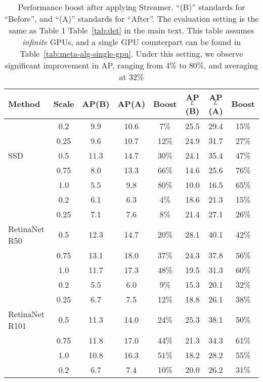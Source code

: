 \begin{table*}[]
\small
\centering
\caption{Performance boost after applying Streamer. ``(B)'' standards for ``Before'', and ``(A)'' standards for ``After''. The evaluation setting is the same as
\ifstandalonesupplement
    Table 1 
\else
    Table~\ref{tab:det}
\fi
in the main text. This table assumes {\em infinite} GPUs, and a single GPU counterpart can be found in Table~\ref{tab:meta-alg-single-gpu}. Under this setting, we observe significant improvement in AP, ranging from 4\% to 80\%, and averaging at 32\%
}
\label{tab:meta-alg-inf-gpu} 
\addtolength{\tabcolsep}{0.2em}
\vspace{-0.5em}
\begin{tabular}{lccccccc}
\toprule
Method & Scale & AP(B) & AP(A) & Boost & AP$_L$(B) & AP$_L$(A) & Boost \\
\midrule
                   & 0.2  & 9.9  & 10.6 & 7\%  & 25.5 & 29.4 & 15\% \\
                   & 0.25 & 9.6  & 10.7 & 12\% & 24.9 & 31.7 & 27\% \\
SSD                & 0.5  & 11.3 & 14.7 & 30\% & 24.1 & 35.4 & 47\% \\
                   & 0.75 & 8.0  & 13.3 & 66\% & 14.6 & 25.6 & 76\% \\
                   & 1.0  & 5.5  & 9.8  & 80\% & 10.0 & 16.5 & 65\% \\
\midrule
                   & 0.2  & 6.1  & 6.3  & 4\%  & 18.6 & 21.3 & 15\% \\
                   & 0.25 & 7.1  & 7.6  & 8\%  & 21.4 & 27.1 & 26\% \\
RetinaNet R50      & 0.5  & 12.3 & 14.7 & 20\% & 28.1 & 40.1 & 42\% \\
                   & 0.75 & 13.1 & 18.0 & 37\% & 24.3 & 37.8 & 56\% \\
                   & 1.0  & 11.7 & 17.3 & 48\% & 19.5 & 31.3 & 60\% \\
\midrule
                   & 0.2  & 5.5  & 6.0  & 9\%  & 15.3 & 20.1 & 32\% \\
                   & 0.25 & 6.7  & 7.5  & 12\% & 18.8 & 26.1 & 38\% \\
RetinaNet R101     & 0.5  & 11.3 & 14.0 & 24\% & 25.3 & 38.1 & 50\% \\
                   & 0.75 & 11.8 & 17.0 & 44\% & 21.3 & 34.3 & 61\% \\
                   & 1.0  & 10.8 & 16.3 & 51\% & 18.2 & 28.2 & 55\% \\
\midrule
                   & 0.2  & 6.7  & 7.4  & 10\% & 20.0 & 26.2 & 31\% \\

\end{tabular}
\end{table*}
